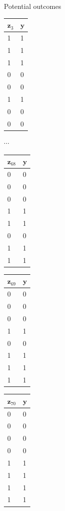 \documentclass[table, xcolor = {dvipsnames}, 9pt]{beamer}
\theoremstyle{plain}
\begin{document}
\begin{frame}{Potential outcomes}
\begin{itemize}
\begin{table}[H]
\begin{tabular}{l|l}
      \toprule
    $\mathbf{z}_3$ & $\mathbf{y}$ \\ \midrule
    1 & 1  \\
    1 & 1  \\
    1 & 1  \\
    0 & 0   \\
    0 & 0  \\
    1 & 1  \\
    0 & 0  \\
    0 & 0  
    \end{tabular}
     \hfill
     $\cdots $
     \hfill
      \begin{tabular}{l|l}
      \toprule
    $\mathbf{z}_{68}$ & $\mathbf{y}$ \\ \midrule
    0 & 0  \\
    0 & 0  \\
    0 & 0  \\
    1 & 1   \\
    1 & 1  \\
    0 & 0  \\
    1 & 1  \\
    1 & 1  
    \end{tabular}
     \hfill
      \begin{tabular}{l|l}
      \toprule
    $\mathbf{z}_{69}$ & $\mathbf{y}$ \\ \midrule
    0 & 0  \\
    0 & 0  \\
    0 & 0  \\
    1 & 1  \\
    0 & 0 \\
    1 & 1  \\
    1 & 1  \\
    1 & 1  
    \end{tabular}
     \hfill
      \begin{tabular}{l|l}
      \toprule
    $\mathbf{z}_{70}$ & $\mathbf{y}$ \\ \midrule
    0 & 0  \\
    0 & 0  \\
    0 & 0  \\
    0 & 0  \\
    1 & 1   \\
    1 & 1  \\
    1 & 1  \\
    1 & 1  
    \end{tabular}
\end{table} \vfill
\end{itemize}  
\vfill
\end{frame}
\end{document}
